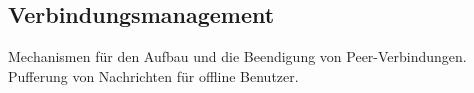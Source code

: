 \subsection{Verbindungsmanagement}

Mechanismen für den Aufbau und die Beendigung von Peer-Verbindungen.
Pufferung von Nachrichten für offline Benutzer.